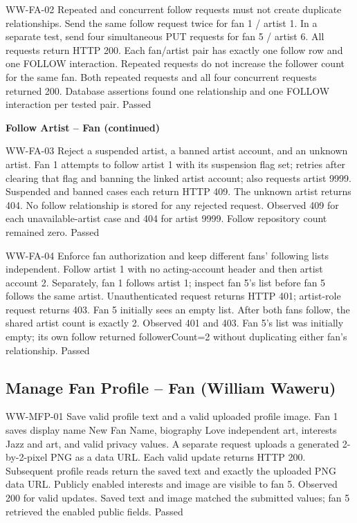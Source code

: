 \documentclass[11pt]{report}
\begin{document}
\williamtestcase
{WW-FA-02}
{Repeated and concurrent follow requests must not create duplicate relationships.}
{Send the same follow request twice for fan 1 / artist 1. In a separate test, send four simultaneous PUT requests for fan 5 / artist 6.}
{All requests return HTTP 200. Each fan/artist pair has exactly one follow row and one FOLLOW interaction. Repeated requests do not increase the follower count for the same fan.}
{Both repeated requests and all four concurrent requests returned 200. Database assertions found one relationship and one FOLLOW interaction per tested pair.}
{Passed}

\clearpage
\noindent\textbf{Follow Artist -- Fan (continued)}\par
\williamtestcase
{WW-FA-03}
{Reject a suspended artist, a banned artist account, and an unknown artist.}
{Fan 1 attempts to follow artist 1 with its suspension flag set; retries after clearing that flag and banning the linked artist account; also requests artist 9999.}
{Suspended and banned cases each return HTTP 409. The unknown artist returns 404. No follow relationship is stored for any rejected request.}
{Observed 409 for each unavailable-artist case and 404 for artist 9999. Follow repository count remained zero.}
{Passed}

\williamtestcase
{WW-FA-04}
{Enforce fan authorization and keep different fans' following lists independent.}
{Follow artist 1 with no acting-account header and then artist account 2. Separately, fan 1 follows artist 1; inspect fan 5's list before fan 5 follows the same artist.}
{Unauthenticated request returns HTTP 401; artist-role request returns 403. Fan 5 initially sees an empty list. After both fans follow, the shared artist count is exactly 2.}
{Observed 401 and 403. Fan 5's list was initially empty; its own follow returned followerCount=2 without duplicating either fan's relationship.}
{Passed}

\clearpage
\subsection*{Manage Fan Profile -- Fan (William Waweru)}
\williamtestcase
{WW-MFP-01}
{Save valid profile text and a valid uploaded profile image.}
{Fan 1 saves display name New Fan Name, biography Love independent art, interests Jazz and art, and valid privacy values. A separate request uploads a generated 2-by-2-pixel PNG as a data URL.}
{Each valid update returns HTTP 200. Subsequent profile reads return the saved text and exactly the uploaded PNG data URL. Publicly enabled interests and image are visible to fan 5.}
{Observed 200 for valid updates. Saved text and image matched the submitted values; fan 5 retrieved the enabled public fields.}
{Passed}
\end{document}
